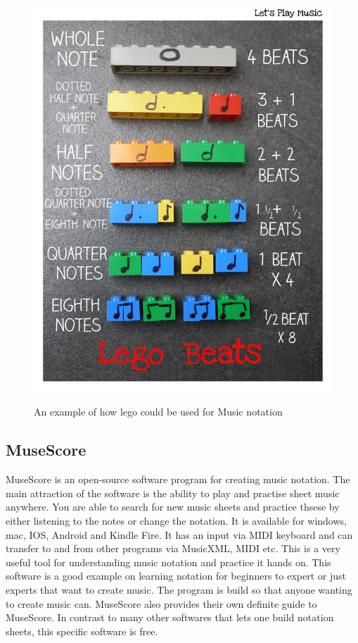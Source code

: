 \begin{figure}[H]
	\centering
	\includegraphics[width=0.7\linewidth]{figure/Analysis/lego}
	\label{fig:lego}
	\caption{An example of how lego could be used for Music notation}
\end{figure}

\subsection{MuseScore}
MuseScore is an open-source software program for creating music notation. The main attraction of the software is the ability to play and practise sheet music anywhere. You are able to search for new music sheets and practice thsese by either listening to the notes or change the notation. It is available for windows, mac, IOS, Android and Kindle Fire. It has an input via MIDI keyboard and can transfer to and from other programs via MusicXML, MIDI etc. This is a very useful tool for understanding music notation and practice it hands on. This software is a good example on learning notation for beginners to expert or just experts that want to create music. The program is build so that anyone wanting to create music can. MuseScore also provides their own definite guide to MuseScore. In contrast to many other softwares that lets one build notation sheets, this specific software is free. 

